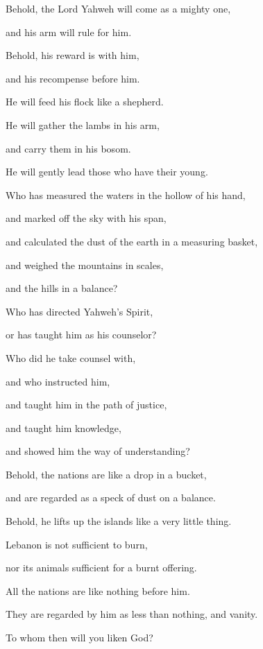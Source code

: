 {\par }{\Q {}Behold, the Lord Yahweh will come as a mighty one,
\par }{\QB and his arm will rule for him.
\par }{\QB Behold, his reward is with him,
\par }{\QB and his recompense before him.
\par }{\Q {}He will feed his flock like a shepherd.
\par }{\QB He will gather the lambs in his arm,
\par }{\QB and carry them in his bosom.
\par }{\QB He will gently lead those who have their young.
\par }{\BB \par }{\Q {}Who has measured the waters in the hollow of his hand,
\par }{\QB and marked off the sky with his span,
\par }{\QB and calculated the dust of the earth in a measuring basket,
\par }{\QB and weighed the mountains in scales,
\par }{\QB and the hills in a balance?
\par }{\Q {}Who has directed Yahweh’s Spirit,
\par }{\QB or has taught him as his counselor?
\par }{\Q {}Who did he take counsel with,
\par }{\QB and who instructed him,
\par }{\QB and taught him in the path of justice,
\par }{\QB and taught him knowledge,
\par }{\QB and showed him the way of understanding?
\par }{\Q {}Behold, the nations are like a drop in a bucket,
\par }{\QB and are regarded as a speck of dust on a balance.
\par }{\QB Behold, he lifts up the islands like a very little thing.
\par }{\Q {}Lebanon is not sufficient to burn,
\par }{\QB nor its animals sufficient for a burnt offering.
\par }{\Q {}All the nations are like nothing before him.
\par }{\QB They are regarded by him as less than nothing, and vanity.
\par }{\BB \par }{\Q {}To whom then will you liken God?
}
